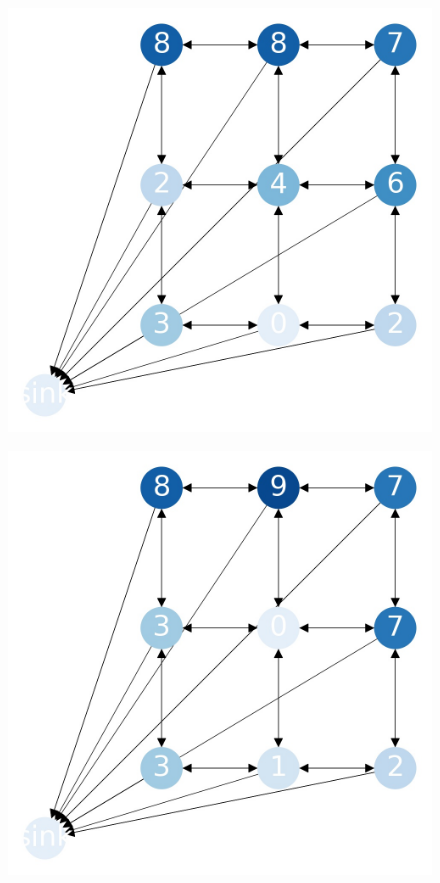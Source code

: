 \documentclass{beamer}
\begin{document}
\begin{frame}
  \begin{figure}[h!]
    \centering
      \includegraphics[scale=0.25]{sandpile_12}
  \end{figure}
\end{frame}


\begin{frame}
  \begin{figure}[h!]
    \centering
      \includegraphics[scale=0.25]{sandpile_13}
  \end{figure}
\end{frame}
\end{document}
